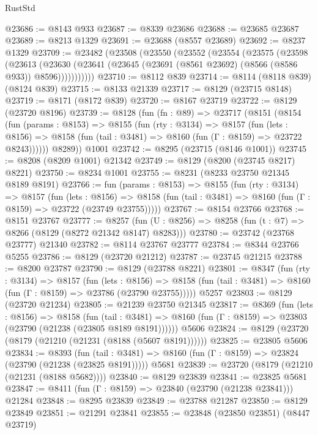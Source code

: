 \begin{lexlean}{RustStd}
\begin{coremodule}
@23686 := @8143 @933
@23687 := @8339 @23686
@23688 := @23685 @23687
@23689 := @8213 @1329
@23691 := @23688 (@8557 @23689)
@23692 := @8237 @1329
@23709 := @23482
    (@23508
      (@23550
        (@23552
          (@23554
            (@23575
              (@23598
                (@23613
                  (@23630
                    (@23641 (@23645 (@23691 (@8561 @23692) (@8566 (@8586 @933)) @8596)))))))))))
@23710 := @8112 @839
@23714 := @8114 (@8118 @839) (@8124 @839)
@23715 := @8133 @21339
@23717 := @8129 (@23715 @8148)
@23719 := @8171 (@8172 @839)
@23720 := @8167 @23719
@23722 := @8129 (@23720 @8196)
@23739 := @8128
    (fun (fn : @89) =>
    @23717
      (@8151
        (@8154
          (fun (params : @8153) =>
          @8155
            (fun (rty : @3134) =>
            @8157
              (fun (lets : @8156) =>
              @8158 (fun (tail : @3481) => @8160 (fun (Γ : @8159) => @23722 @8243))))))
        @8289))
    @1001
@23742 := @8295 (@23715 (@8146 @1001))
@23745 := @8208 (@8209 @1001) @21342
@23749 := @8129 (@8200 (@23745 @8217) @8221)
@23750 := @8234 @1001
@23755 := @8231 (@8233 @23750 @21345 @8189 @8191)
@23766 := fun (params : @8153) =>
  @8155
    (fun (rty : @3134) =>
    @8157
      (fun (lets : @8156) =>
      @8158 (fun (tail : @3481) => @8160 (fun (Γ : @8159) => @23722 (@23749 @23755)))))
@23767 := @8154 @23766
@23768 := @8151 @23767
@23777 := @8257
    (fun (U : @8256) => @8258 (fun (t : @7) => @8266 (@8129 (@8272 @21342 @8147) @8283)))
@23780 := @23742 (@23768 @23777) @21340
@23782 := @8114 @23767 @23777
@23784 := @8344 @23766 @5255
@23786 := @8129 (@23720 @21212)
@23787 := @23745 @21215
@23788 := @8200 @23787
@23790 := @8129 (@23788 @8221)
@23801 := @8347
    (fun (rty : @3134) =>
    @8157
      (fun (lets : @8156) =>
      @8158 (fun (tail : @3481) => @8160 (fun (Γ : @8159) => @23786 (@23790 @23755)))))
    @5257
@23803 := @8129 (@23720 @21234)
@23805 := @21239 @23750 @21345
@23817 := @8369
    (fun (lets : @8156) =>
    @8158
      (fun (tail : @3481) =>
      @8160 (fun (Γ : @8159) => @23803 (@23790 (@21238 (@23805 @8189 @8191))))))
    @5606
@23824 := @8129 (@23720 (@8179 (@21210 (@21231 (@8188 (@5607 @8191))))))
@23825 := @23805 @5606
@23834 := @8393
    (fun (tail : @3481) => @8160 (fun (Γ : @8159) => @23824 (@23790 (@21238 (@23825 @8191)))))
    @5681
@23839 := @23720 (@8179 (@21210 (@21231 (@8188 @5682))))
@23840 := @8129 @23839
@23841 := @23825 @5681
@23847 := @8411 (fun (Γ : @8159) => @23840 (@23790 (@21238 @23841))) @21284
@23848 := @8295 @23839
@23849 := @23788 @21287
@23850 := @8129 @23849
@23851 := @21291 @23841
@23855 := @23848 (@23850 @23851) (@8447 @23719)

\end{coremodule}
\end{lexlean}
